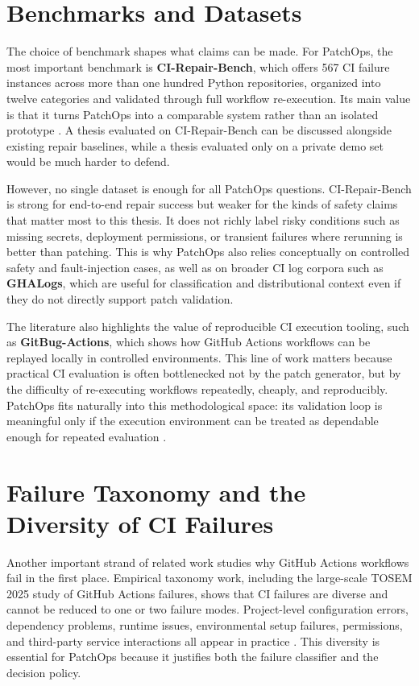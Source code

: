 \section{Benchmarks and Datasets}

The choice of benchmark shapes what claims can be made. For PatchOps, the most important benchmark is
\textbf{CI-Repair-Bench}, which offers 567 CI failure instances across more than one hundred Python repositories,
organized into twelve categories and validated through full workflow re-execution. Its main value is that it
turns PatchOps into a comparable system rather than an isolated prototype \cite{cirepairbench2026}. A thesis evaluated on
CI-Repair-Bench can be discussed alongside existing repair baselines, while a thesis evaluated only on a private
demo set would be much harder to defend.

However, no single dataset is enough for all PatchOps questions. CI-Repair-Bench is strong for end-to-end
repair success but weaker for the kinds of safety claims that matter most to this thesis. It does not richly
label risky conditions such as missing secrets, deployment permissions, or transient failures where rerunning is
better than patching. This is why PatchOps also relies conceptually on controlled safety and fault-injection
cases, as well as on broader CI log corpora such as \textbf{GHALogs}, which are useful for classification and
distributional context even if they do not directly support patch validation.

The literature also highlights the value of reproducible CI execution tooling, such as \textbf{GitBug-Actions},
which shows how GitHub Actions workflows can be replayed locally in controlled environments. This line of work
matters because practical CI evaluation is often bottlenecked not by the patch generator, but by the difficulty
of re-executing workflows repeatedly, cheaply, and reproducibly. PatchOps fits naturally into this methodological
space: its validation loop is meaningful only if the execution environment can be treated as dependable enough
for repeated evaluation \cite{ghalogs2025,gitbugactions2024}.

\section{Failure Taxonomy and the Diversity of CI Failures}

Another important strand of related work studies why GitHub Actions workflows fail in the first place.
Empirical taxonomy work, including the large-scale TOSEM 2025 study of GitHub Actions failures, shows that CI
failures are diverse and cannot be reduced to one or two failure modes. Project-level configuration errors,
dependency problems, runtime issues, environmental setup failures, permissions, and third-party service
interactions all appear in practice \cite{ghataxonomy2025}. This diversity is essential for PatchOps because it justifies both the
failure classifier and the decision policy.

